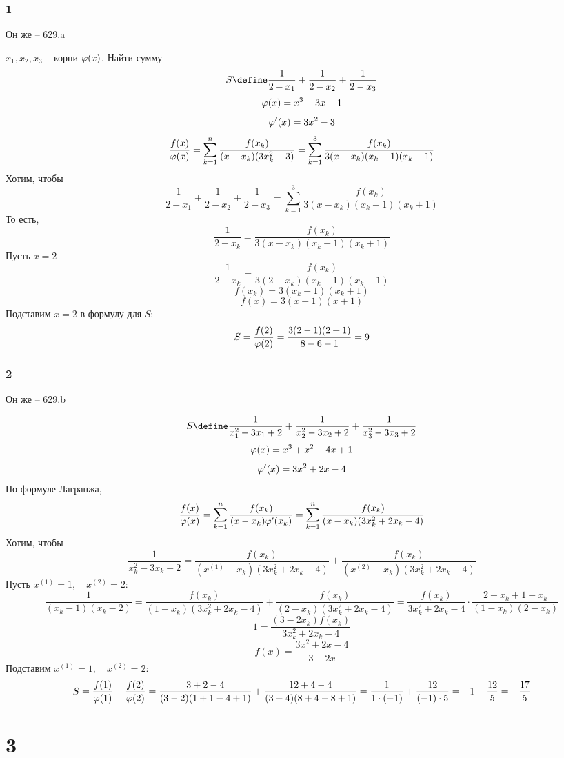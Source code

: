 \subsection{1}

Он же -- 629.a

$ x_1, x_2, x_3 $ -- корни $ \varphi(x) $. Найти сумму
$$ S \define \frac1{2 - x_1} + \frac1{2 - x_2} + \frac1{2 - x_3} $$
$$ \varphi(x) = x^3 - 3x - 1 $$
$$ \varphi'(x) = 3x^2 - 3 $$
$$ \frac{f(x)}{\varphi(x)} = \sum_{k = 1}^n \frac{f(x_k)}{(x - x_k)(3x_k^2 - 3)} = \sum_{k = 1}^3 \frac{f(x_k)}{3(x - x_k)(x_k - 1)(x_k + 1)} $$
Хотим, чтобы
$$ \frac1{2 - x_1} + \frac1{2 - x_2} + \frac1{2 - x_3} = \sum_{k = 1}^3 \frac{f(x_k)}{3(x - x_k)(x_k - 1)(x_k + 1)} $$
То есть,
$$ \frac1{2 - x_k} = \frac{f(x_k)}{3(x - x_k)(x_k - 1)(x_k + 1)} $$
Пусть $ x = 2 $
$$ \frac1{2 - x_k} = \frac{f(x_k)}{3(2 - x_k)(x_k - 1)(x_k + 1)} $$
$$ f(x_k) = 3(x_k - 1)(x_k + 1) $$
$$ f(x) = 3(x - 1)(x + 1) $$
Подставим $ x = 2 $ в формулу для $ S $:
$$ S = \frac{f(2)}{\varphi(2)} = \frac{3(2 - 1)(2 + 1)}{8 - 6 - 1} = 9 $$

\subsection{2}

Он же -- 629.b

$$ S \define \frac1{x_1^2 - 3x_1 + 2} + \frac1{x_2^2 - 3x_2 + 2} + \frac1{x_3^2 - 3x_3 + 2} $$
$$ \varphi(x) = x^3 + x^2 - 4x + 1 $$
$$ \varphi'(x) = 3x^2 + 2x - 4 $$
По формуле Лагранжа,
$$ \frac{f(x)}{\varphi(x)} = \sum_{k = 1}^n \frac{f(x_k)}{(x - x_k)\varphi'(x_k)} = \sum_{k = 1}^n \frac{f(x_k)}{(x - x_k)(3x_k^2 + 2x_k - 4)} $$
Хотим, чтобы
$$ \frac1{x_k^2 - 3x_k + 2} = \frac{f(x_k)}{(x^{(1)} - x_k)(3x_k^2 + 2x_k - 4)} + \frac{f(x_k)}{(x^{(2)} - x_k)(3x_k^2 + 2x_k - 4)} $$
Пусть $ x^{(1)} = 1, \quad x^{(2)} = 2 $:
$$ \frac1{(x_k - 1)(x_k - 2)} = \frac{f(x_k)}{(1 - x_k)(3x_k^2 + 2x_k - 4)} + \frac{f(x_k)}{(2 - x_k)(3x_k^2 + 2x_k - 4)} = \frac{f(x_k)}{3x_k^2 + 2x_k - 4} \cdot \frac{2 - x_k + 1 - x_k}{(1 - x_k)(2 - x_k)} $$
$$ 1 = \frac{(3 - 2x_k)f(x_k)}{3x_k^2 + 2x_k - 4} $$
$$ f(x) = \frac{3x^2 + 2x - 4}{3 - 2x} $$
Подставим $ x^{(1)} = 1, \quad x^{(2)} = 2 $:
$$ S = \frac{f(1)}{\varphi(1)} + \frac{f(2)}{\varphi(2)} = \frac{3 + 2 - 4}{(3 - 2)(1 + 1 - 4 +1)} + \frac{12 + 4 - 4}{(3 - 4)(8 + 4 - 8 + 1)} = \frac1{1 \cdot (-1)} + \frac{12}{(-1) \cdot 5} = -1 - \frac{12}5 = -\frac{17}5 $$

\chapter{3}

